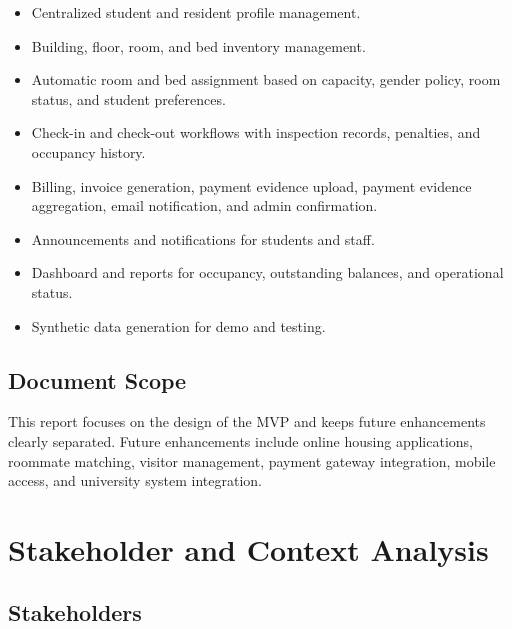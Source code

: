 \documentclass[11pt,a4paper]{article}
\begin{document}
\begin{itemize}
  \item Centralized student and resident profile management.
  \item Building, floor, room, and bed inventory management.
  \item Automatic room and bed assignment based on capacity, gender policy, room status, and student preferences.
  \item Check-in and check-out workflows with inspection records, penalties, and occupancy history.
  \item Billing, invoice generation, payment evidence upload, payment evidence aggregation, email notification, and admin confirmation.
  \item Announcements and notifications for students and staff.
  \item Dashboard and reports for occupancy, outstanding balances, and operational status.
  \item Synthetic data generation for demo and testing.
\end{itemize}

\subsection{Document Scope}
This report focuses on the design of the MVP and keeps future enhancements clearly separated. Future enhancements include online housing applications, roommate matching, visitor management, payment gateway integration, mobile access, and university system integration.

\section{Stakeholder and Context Analysis}

\subsection{Stakeholders}
\end{document}
